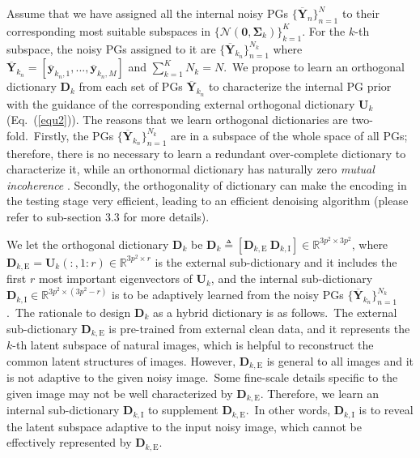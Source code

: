 \documentclass[10pt,twocolumn,letterpaper]{article}
\begin{document}
Assume that we have assigned all the internal noisy PGs $\{\mathbf{\overline{Y}}_{n}\}_{n=1}^{N}$ to their corresponding most suitable subspaces in $\{\mathcal{N}(\mathbf{0},\mathbf{\Sigma}_{k})\}_{k=1}^{K}$. For the $k$-th subspace, the noisy PGs assigned to it are $\{\mathbf{\overline{Y}}_{k_{n}}\}_{n=1}^{N_{k}}$ where $\mathbf{\overline{Y}}_{k_{n}}=[\mathbf{\overline{y}}_{k_{n},1},...,\mathbf{\overline{y}}_{k_{n},M}]$ and $\sum_{k=1}^{K}N_{k}=N$.\ We propose to learn an orthogonal dictionary $\mathbf{D}_{k}$ from each set of PGs $\mathbf{\overline{Y}}_{k_{n}}$ to characterize the internal PG prior with the guidance of the corresponding external orthogonal dictionary $\mathbf{U}_{k}$ (Eq.\ (\ref{equ2})). The reasons that we learn orthogonal dictionaries are two-fold.\ Firstly, the PGs $\{\mathbf{\overline{Y}}_{k_{n}}\}_{n=1}^{N_{k}}$ are in a subspace of the whole space of all PGs; therefore, there is no necessary to learn a redundant over-complete dictionary to characterize it, while an orthonormal dictionary has naturally zero \emph{mutual incoherence} \cite{donoho2001uncertainty}. Secondly, the orthogonality of dictionary can make the encoding in the testing stage very efficient, leading to an efficient denoising algorithm (please refer to sub-section 3.3 for more details).

We let the orthogonal dictionary $\mathbf{D}_{k}$ be $\mathbf{D}_{k}\triangleq[\mathbf{D}_{k,\text{E}}\ \mathbf{D}_{k,\text{I}}]\in \mathbb{R}^{3p^2\times 3p^2}$, where $\mathbf{D}_{k,\text{E}}=\mathbf{U}_{k}(:,1:r)\in\mathbb{R}^{3p^2\times r}$ is the external sub-dictionary and it includes the first $r$ most important eigenvectors of $\mathbf{U}_{k}$, and the internal sub-dictionary $\mathbf{D}_{k,\text{I}}\in\mathbb{R}^{3p^2\times (3p^2-r)}$ is to be adaptively learned from the noisy PGs $\{\mathbf{\overline{Y}}_{k_{n}}\}_{n=1}^{N_{k}}$.\ The rationale to design $\mathbf{D}_{k}$ as a hybrid dictionary is as follows.\ The external sub-dictionary $\mathbf{D}_{k,\text{E}}$ is pre-trained from external clean data, and it represents the $k$-th latent subspace of natural images, which is helpful to reconstruct the common latent structures of images. However, $\mathbf{D}_{k,\text{E}}$ is general to all images and it is not adaptive to the given noisy image.\ Some fine-scale details specific to the given image may not be well characterized by $\mathbf{D}_{k,\text{E}}$. Therefore, we learn an internal sub-dictionary $\mathbf{D}_{k,\text{I}}$ to supplement $\mathbf{D}_{k,\text{E}}$.\ In other words, $\mathbf{D}_{k,\text{I}}$ is to reveal the latent subspace adaptive to the input noisy image, which cannot be effectively represented by $\mathbf{D}_{k,\text{E}}$. 
\end{document}
